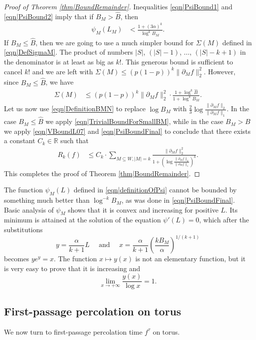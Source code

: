 \documentclass[reqno]{amsart}
\begin{document}
\begin{proof}[Proof of Theorem \ref{thm|BoundRemainder}]
Inequalities \eqref{eqn|PsiBound1} and \eqref{eqn|PsiBound2} imply that if $B_M>\hat B$, then
\begin{align}
\psi_M(L_M)&<\frac{1+(3\alpha)^k}{\log^kB_M}. \label{eqn|PsiBoundFinal}
\end{align}
If $B_M\leq \hat B$, then we are going to use a much simpler bound for $\Sigma(M)$ defined in \eqref{eqn|DefSigmaM}. The product of numbers $|S|$, $(|S|-1)$, $\dots$, $(|S|-k+1)$ in the denominator is at least as big as $k!$. This generous bound is sufficient to cancel $k!$ and we are left with $\Sigma(M)\leq (p(1-p))^k\|\partial_Mf\|_2^2$. 
However, since $B_M\leq \hat B$, we have 
\begin{align}
\Sigma(M)&\leq (p(1-p))^k\|\partial_Mf\|_2^2\cdot \frac{1+\log^k \hat B}{1+\log^kB_M}. \label{eqn|TrivialBoundForSmallBM}
\end{align}
Let us now use \eqref{eqn|DefinitionBMN} to replace $\log B_M$ with $\frac23\log \frac{\|\partial_Mf\|_2}{\|\partial_Mf\|_1}$. In the case $B_M\leq \hat B$ we apply \eqref{eqn|TrivialBoundForSmallBM}, while in the case $B_M>\hat B$ we apply \eqref{eqn|VBoundL07} and \eqref{eqn|PsiBoundFinal} to conclude that there exists a constant $C_k\in\mathbb R$ 
such that 
\begin{align*}
R_k(f)&\leq C_k\cdot \sum_{M\subseteq W,|M|=k}\frac{\|\partial_Mf\|_2^2}{1+\left(\log \frac{\|\partial_Mf\|_2}{\|\partial_Mf\|_1}\right)^k}.  
\end{align*}
This completes the proof of Theorem \ref{thm|BoundRemainder}. 
\end{proof}

 The function $\psi_M(L)$ defined in \eqref{eqn|definitionOfPsi} cannot be bounded by something much better than $\log^{-k}B_M$, as was done in \eqref{eqn|PsiBoundFinal}. Basic analysis of $\psi_M$ shows that it is convex and increasing for positive $L$. Its minimum is attained at the solution of the equation $\psi'(L)=0$, which after the substitutions \[y=\frac{\alpha}{k+1}L\quad\text{ and }\quad x=\frac{\alpha}{k+1}\left(\frac{kB_M}{\alpha}\right)^{1/(k+1)}\] becomes 
$ye^y=x$. The function $x\mapsto y(x)$ is not an elementary function, but it is very easy to prove that it is increasing and 
\[\lim_{x\to+\infty}\frac{y(x)}{\log x}=1.\]


\subsection{First-passage percolation on torus}
We now turn to first-passage percolation time $f^{\tau}$ on torus. 
\end{document}
